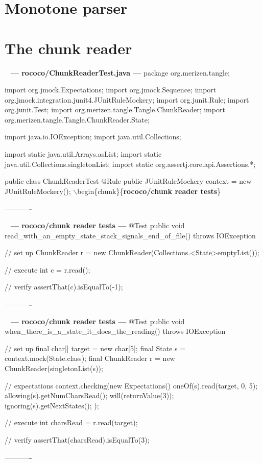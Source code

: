 \documentclass{book}
\newenvironment{chunk}[1]{%
{\ }\newline\noindent%
\hbox{\hskip 2.0cm}{\bf --- #1 ---}%
\verbatim}%                               say exactly what we see
{\endverbatim%
\par{}%
\noindent{}%
\hbox{\hskip 2.0cm}{\bf ----------}%
\par%
\normalsize\noindent}%
\providecommand{\getchunk}[1]{%
\noindent%
{\small $\backslash{}$begin\{chunk\}\{{\bf #1}\}}%
\index{{#1}}}
\begin{document}
\section{Monotone parser}
\section{The chunk reader}
\begin{chunk}{rococo/ChunkReaderTest.java}
package org.merizen.tangle;

import org.jmock.Expectations;
import org.jmock.Sequence;
import org.jmock.integration.junit4.JUnitRuleMockery;
import org.junit.Rule;
import org.junit.Test;
import org.merizen.tangle.Tangle.ChunkReader;
import org.merizen.tangle.Tangle.ChunkReader.State;

import java.io.IOException;
import java.util.Collections;

import static java.util.Arrays.asList;
import static java.util.Collections.singletonList;
import static org.assertj.core.api.Assertions.*;

public class ChunkReaderTest {
    @Rule
    public JUnitRuleMockery context = new JUnitRuleMockery();
\getchunk{rococo/chunk reader tests}
}
\end{chunk}

\begin{chunk}{rococo/chunk reader tests}
@Test
public void read_with_an_empty_state_stack_signals_end_of_file() throws IOException {
    // set up
    ChunkReader r = new ChunkReader(Collections.<State>emptyList());

    // execute
    int c = r.read();

    // verify
    assertThat(c).isEqualTo(-1);
}
\end{chunk}

\begin{chunk}{rococo/chunk reader tests}
@Test
public void when_there_is_a_state_it_does_the_reading() throws IOException {
    // set up
    final char[] target = new char[5];
    final State s = context.mock(State.class);
    final ChunkReader r = new ChunkReader(singletonList(s));

    // expectations
    context.checking(new Expectations() {{
        oneOf(s).read(target, 0, 5);
        allowing(s).getNumCharsRead();
        will(returnValue(3));
        ignoring(s).getNextStates();
    }});

    // execute
    int charsRead = r.read(target);

    // verify
    assertThat(charsRead).isEqualTo(3);
}
\end{chunk}
\end{document}

